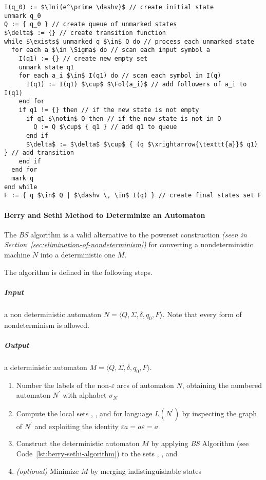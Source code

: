 \documentclass[english]{article}
\begin{document}
\begin{lstlisting}[caption={Berry and Sethi Algorithm}, label=lst:berry-sethi-algorithm]
I(q_0) := $\Ini(e^\prime \dashv)$ // create initial state
unmark q_0
Q := { q_0 } // create queue of unmarked states
$\delta$ := {} // create transition function
while $\exists$ unmarked q $\in$ Q do // process each unmarked state
  for each a $\in \Sigma$ do // scan each input symbol a
    I(q1) := {} // create new empty set
    unmark state q1
    for each a_i $\in$ I(q1) do // scan each symbol in I(q)
      I(q1) := I(q1) $\cup$ $\Fol(a_i)$ // add followers of a_i to I(q1)
    end for
    if q1 != {} then // if the new state is not empty
      if q1 $\notin$ Q then // if the new state is not in Q
        Q := Q $\cup$ { q1 } // add q1 to queue
      end if
      $\delta$ := $\delta$ $\cup$ { (q $\xrightarrow{\texttt{a}}$ q1) } // add transition
    end if
  end for
  mark q
end while
F := { q $\in$ Q | $\dashv \, \in$ I(q) } // create final states set F
\end{lstlisting}

\paragraph{Berry and Sethi Method to Determinize an Automaton}
The \textit{BS} algorithm is a valid alternative to the powerset construction \textit{(seen in Section~\ref{sec:elimination-of-nondeterminism})}
for converting a nondeterministic machine \(N\) into a deterministic one \(M\).

The algorithm is defined in the following steps.

\subparagraph*{Input}
a non deterministic automaton \(N = \langle Q, \Sigma, \delta, q_0, F \rangle\).
Note that every form of nondeterminism is allowed.

\subparagraph*{Output}
a deterministic automaton \(M = \langle Q, \Sigma, \delta, q_0, F \rangle\).

\begin{enumerate}
  \item Number the labels of the non-\(\varepsilon\) arcs of automaton \(N\), obtaining the numbered automaton \(N^\prime\) with alphabet \(\sigma_N\)
  \item Compute the local sets \Ini, \Fin, and \Fol for language \(L(N^\prime)\) by inspecting the graph of \(N^\prime\) and exploiting the identity \(\varepsilon a = a \varepsilon = a\)
  \item Construct the deterministic automaton \(M\) by applying \textit{BS} Algorithm (see Code~\ref{lst:berry-sethi-algorithm}) to the sets \Ini, \Fin, and \Fol
  \item \textit{(optional)} Minimize \(M\) by merging indistinguishable states
\end{enumerate}
\end{document}
